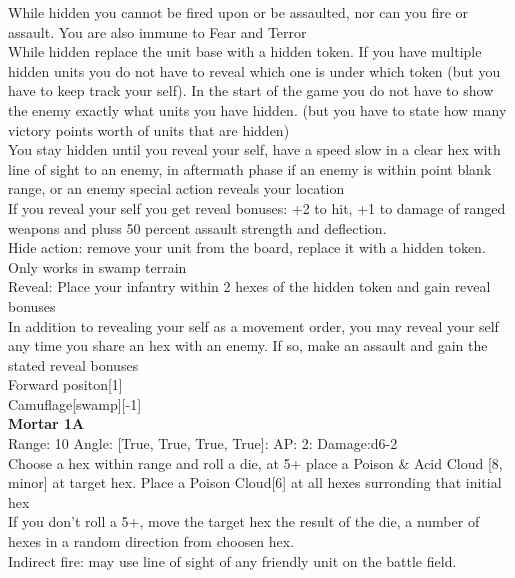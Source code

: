 {While hidden you cannot be fired upon or be assaulted, nor can you fire or assault. You are also immune to Fear and Terror\\ 
While hidden replace the unit base with a hidden token. If you have multiple hidden units you do not have to reveal which one is under which token (but you have to keep track your self). In the start of the game you do not have to show the enemy exactly what units you have hidden. (but you have to state how many victory points worth of units that are hidden)\\ 
You stay hidden until you reveal your self, have a speed slow in a clear hex with line of sight to an enemy, in aftermath phase if an enemy is within point blank range, or an enemy special action reveals your location\\ 
If you reveal your self you get reveal bonuses: +2 to hit, +1 to damage of ranged weapons and pluss 50 percent assault strength and deflection.\\ 
Hide action: remove your unit from the board, replace it with a hidden token. Only works in swamp terrain\\ 
Reveal: Place your infantry within 2 hexes of the hidden token and gain reveal bonuses\\ 
In addition to revealing your self as a movement order, you may reveal your self any time you share an hex with an enemy. If so, make an assault and gain the stated reveal bonuses\\ 
Forward positon[1]\\ 
Camuflage[swamp][-1]\\ 





{\bf Mortar 1A } \\



Range: 10  Angle: [True, True, True, True]: AP: 2: Damage:d6-2 \\
Choose a hex within range and roll a die, at 5+ place a Poison \& Acid Cloud [8, minor] at target hex. Place a Poison Cloud[6]  at all hexes surronding that initial hex\\ 
If you don't roll a 5+, move the target hex the result of the die, a number of hexes in a random direction from choosen hex.\\ 
Indirect fire: may use line of sight of any friendly unit on the battle field.\\ 




}
